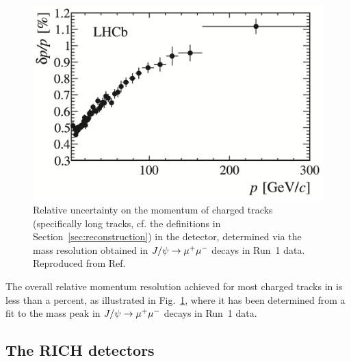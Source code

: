 \begin{figure}[tb]
    \centering
    \includegraphics[width=0.55\columnwidth]{figures/detector/momentum_resolution.png}
    \caption{Relative uncertainty on the momentum of charged tracks (specifically long tracks, cf. the definitions in Section~\ref{sec:reconstruction}) in the \lhcb detector, determined via the mass resolution obtained in $J/\psi\rightarrow{\ensuremath{\mu^+}}\mu^-$ decays in Run~1 data. Reproduced from Ref.~\cite{LHCb-Performance}}
    \label{fig:momentum_resolution}
\end{figure}

The overall relative momentum resolution achieved for most charged tracks in \lhcb is less than a percent, as illustrated in Fig.~\ref{fig:momentum_resolution}, where it has been determined from a fit to the mass peak in $J/\psi\rightarrow{\ensuremath{\mu^+}}\mu^-$ decays in Run~1 data. 


\subsection{The RICH detectors} %
\label{sub:the_rich}

